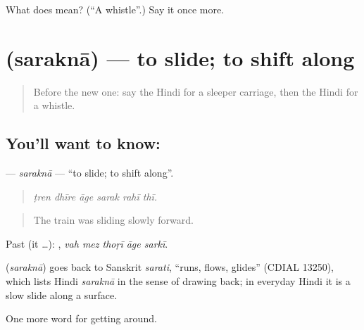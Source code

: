 \begin{tcolorbox}[breakable,colback=teal!4,colframe=teal!35!black,title={Before you move on}]
What does  mean? (\textquotedblleft{}A whistle\textquotedblright{}.) Say it once more.
\end{tcolorbox}
\section[\texorpdfstring{\hi{सरकना} (saraknā)}{सरकना (saraknā)}]{ (saraknā) — to slide; to shift along}

\label{lesson:HI-C399-sarakna}



\begin{quote}
Before the new one: say the Hindi for a sleeper carriage, then the Hindi for a whistle.
\end{quote}

\subsection*{You'll want to know: }
\textbf{} — \emph{saraknā} — \textquotedblleft{}to slide; to shift along\textquotedblright{}.

\begin{quote}
     
\end{quote}

\begin{quote}
\emph{ṭren dhīre āge sarak rahī thī.}
\end{quote}

\begin{quote}
The train was sliding slowly forward.
\end{quote}

Past (it …):     , \emph{vah mez thoṛī āge sarkī}.

\begin{cousinweb}
\textbf{} (\emph{saraknā}) goes back to Sanskrit \emph{sarati}, \textquotedblleft{}runs, flows, glides\textquotedblright{} (CDIAL 13250), which lists Hindi \emph{saraknā} in the sense of drawing back; in everyday Hindi it is a slow slide along a surface.
\end{cousinweb}

\begin{grammarlens}[title={What you've built}]
One more word for getting around.
\end{grammarlens}

